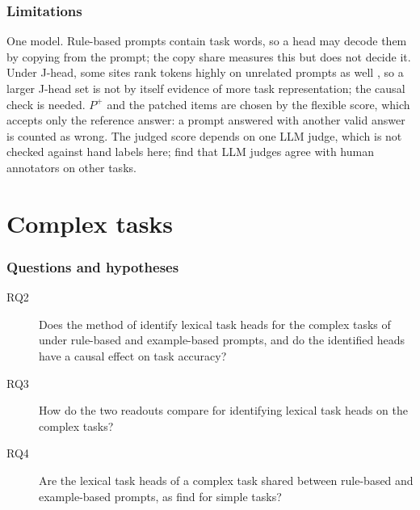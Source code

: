 \documentclass[11pt,a4paper]{article}
\begin{document}
\begin{table}[tbp]
\centering\footnotesize

\caption{E1b, first causal check: causal effect of the control mean at the head sets of Table~\ref{tab:heads-consensus}, as the control columns of Table~\ref{tab:effects-simple}.}
\label{tab:effects-consensus-control}
\end{table}

\begin{table}[tbp]
\centering\footnotesize

\caption{E1b, second causal check: causal effect of the head sets of Table~\ref{tab:heads-consensus} with rule-style means, as in Table~\ref{tab:effects-simple-wrong}. Items: the wrongly answered 1-shot prompts patched; the baseline is 0.}
\label{tab:effects-consensus-wrong}
\end{table}

\section{Limitations}\label{sec:lim-simple}
One model. Rule-based prompts contain task words, so a head may decode them by copying from the prompt; the copy share measures this but does not decide it. Under J-head, some sites rank tokens highly on unrelated prompts as well \citep[Sec.~3.6]{merlo2026headjlens}, so a larger J-head set is not by itself evidence of more task representation; the causal check is needed. $P^{+}$ and the patched items are chosen by the flexible score, which accepts only the reference answer: a prompt answered with another valid answer is counted as wrong. The judged score depends on one LLM judge, which is not checked against hand labels here; \citet{hua2025flaw} find that LLM judges agree with human annotators on other tasks.

\part{Complex tasks}\label{part:complex}

\section{Questions and hypotheses}\label{sec:rq-complex}
\begin{description}
\item[RQ2] Does the method of \citet{yang2026shared} identify lexical task heads for the complex tasks of \citet{fu2026rules} under rule-based and example-based prompts, and do the identified heads have a causal effect on task accuracy?
\item[RQ3] How do the two readouts compare for identifying lexical task heads on the complex tasks?
\item[RQ4] Are the lexical task heads of a complex task shared between rule-based and example-based prompts, as \citet{yang2026shared} find for simple tasks?
\end{description}
\end{document}
